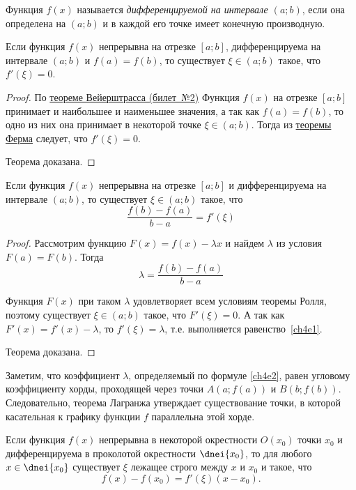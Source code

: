 \begin{defn}
Функция $f(x)$ называется \textit{дифференцируемой на интервале $(a;b)$}, если она определена на $(a;b)$ и в каждой его точке имеет конечную производную.

\end{defn}
\begin{thm}  Если функция $f(x)$ непрерывна на отрезке $[a; b]$, дифференцируема на интервале $(a; b)$ и $f(a) = f(b)$, то существует $\xi \in (a; b)$ такое, что $f'(\xi) = 0$.
\end{thm}
\begin{proof}
По \hyperref[{th:ch2:Veyershtrass}]{теореме Вейерштрасса (билет~№2)} Функция $f(x)$ на отрезке $[a;b]$ принимает и наибольшее и наименьшее значения, а так как $f(a) = f(b)$, то одно из них она принимает в некоторой точке $\xi \in (a; b)$. Тогда из  \hyperref[ch4n1]{теоремы Ферма} следует, что $f'(\xi) = 0$.
 
Теорема доказана.
\end{proof}

\begin{thm}\label{ch4t1} Если функция $f(x)$ непрерывна на отрезке $[a; b]$ и дифференцируема на интервале $(a; b)$, то существует $\xi \in (a; b)$ такое, что
\begin{equation}\label{ch4e1}
\frac{f(b)-f(a)}{b-a}=f'(\xi)
\end{equation}
\end{thm}

\begin{proof} Рассмотрим функцию $F(x) = f(x) - \lambda x$ и найдем $\lambda$ из условия $F(a) = F(b)$. Тогда
\begin{equation}\label{ch4e2}
\lambda=\frac{f(b)-f(a)}{b-a}
\end{equation}

Функция $F(x)$ при таком $\lambda$ удовлетворяет всем условиям теоремы Ролля, поэтому существует $\xi \in (a; b)$ такое, что $F'(\xi) = 0$. А так как $F'(x) = f'(x) - \lambda$, то $f'(\xi) = \lambda$, т.е. выполняется равенство~\eqref{ch4e1}.
 
Теорема доказана.
\end{proof}
Заметим, что коэффициент $\lambda$, определяемый по формуле \eqref{ch4e2}, равен угловому коэффициенту хорды, проходящей через точки $A(a;f(a))$ и $B(b;f(b))$. Следовательно, теорема Лагранжа утверждает существование точки, в которой касательная к графику функции $f$ параллельна этой хорде.
\begin{cons} 
Если функция $f(x)$ непрерывна в некоторой окрестности $O(x_0)$ точки $x_0$ и дифференцируема в проколотой
окрестности $\dnei{x_0}$, то для любого $x \in \dnei{x_0}$ существует $\xi$ лежащее строго между $x$ и $x_0$ и такое, что
\begin{equation}\label{ch4e3}
f(x)-f(x_0)=f'(\xi)(x-x_0).
\end{equation}
\end{cons}

